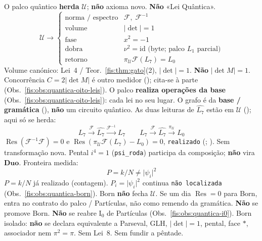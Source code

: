 \documentclass[livro.tex]{subfiles}
\begin{document}
\begin{observacao}\label{fis:obs:quantica-grafo-fecho}
O palco quântico \textbf{herda} \(\mathcal{U}\);
\textbf{não} axioma novo. \textbf{Não} «Lei Quântica».
\[
\boxed{\;
\mathcal{U}\longrightarrow
\begin{cases}
\text{norma / espectro}
  & \mathcal{F},\;\mathcal{F}^{-1}\\
\text{volume}
  & \lvert\det\rvert=1\\
\text{fase}
  & x^{2}=-1\\
\text{dobra}
  & \nu^{2}=\mathrm{id}
    \text{ (byte; palco $L_1$ parcial)}\\
\text{retorno}
  & \pi_{\mathcal{U}}\mathcal{F}(L_7)=L_0
\end{cases}
\;}
\]
Volume canónico: Lei~4 /
Teor.~\ref{fis:thm:gato}(2),
\(\lvert\det\rvert=1\).
\textbf{Não} \(\lvert\det M\rvert=1\).
Concorrência \(C=2\lvert\det M\rvert\)
é outro medidor
();
cita-se à parte
(Obs.~\ref{fis:obs:quantica-oito-leis}).
O palco \textbf{realiza operações da base}
(Obs.~\ref{fis:obs:quantica-oito-leis}):
cada lei no seu lugar.
O grafo é da
\textbf{base / gramática}
(),
\textbf{não} um circuito quântico.
As duas leituras de \(\widehat{L_7}\)
estão em \(\mathcal{U}\)
();
aqui só se herda:
\[
\boxed{\;
L_7\overset{\mathcal{F}}{\longrightarrow}\widehat{L_7}
\overset{\mathcal{F}^{-1}}{\longrightarrow}L_7
\qquad
L_7\overset{\mathcal{F}}{\longrightarrow}\widehat{L_7}
\overset{\pi_{\mathcal{U}}}{\longrightarrow}L_0
\;}
\]
\(\operatorname{Res}(\mathcal{F}^{-1}\mathcal{F})=0\)
e
\(\operatorname{Res}(\pi_{\mathcal{U}}\mathcal{F}(L_7)-L_0)=0\),
\texttt{realizado}
(;
).
Sem transformação nova.
Pental \(i^{4}=1\) (\texttt{psi\_roda})
participa da composição; \textbf{não} vira
\(\mathbf{Duo}\).
Fronteira medida:
\[
\boxed{\;
P=k/N
\neq
\lvert\psi_i\rvert^{2}
\;}
\]
\(P=k/N\) já realizado (contagem).
\(P_i=\lvert\psi_i\rvert^{2}\) continua
\texttt{não localizada}
(Obs.~\ref{fis:obs:quantica-born}).
Born \textbf{não} fecha \(\mathcal{U}\).
Se um dia \(\operatorname{Res}=0\) para Born,
entra no contrato do palco / Partículas,
não como remendo da gramática.
\textbf{Não} se promove Born.
\textbf{Não} se reabre \(\mathrm{I}_{0}\)
de Partículas
(Obs.~\ref{fis:obs:quantica-i0}).
Born isolado: \textbf{não} se declara
equivalente a Parseval, GLH,
\(\lvert\det\rvert=1\), pental, face \(*\),
associador nem \(\pi^{2}=\pi\).
Sem Lei~8. Sem fundir a pêntade.
\end{observacao}
\end{document}
